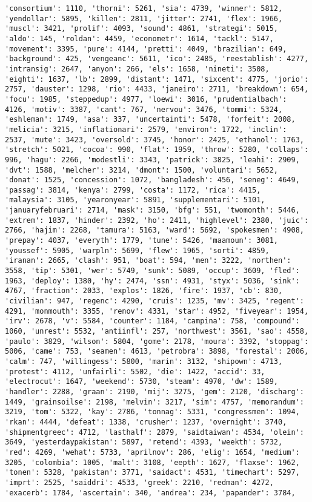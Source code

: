 \documentclass[11pt]{article}
\begin{document}
\begin{Verbatim}[commandchars=\\\{\}]
'consortium': 1110, 'thorni': 5261, 'sia': 4739, 'winner': 5812, 'yendollar': 5895, 'killen': 2811, 'jitter': 2741, 'flex': 1966, 'muscl': 3421, 'prolif': 4093, 'sound': 4861, 'strategi': 5015, 'aldo': 145, 'roldan': 4459, 'econometr': 1614, 'tackl': 5147, 'movement': 3395, 'pure': 4144, 'pretti': 4049, 'brazilian': 649, 'background': 425, 'vengeanc': 5611, 'ico': 2485, 'reestablish': 4277, 'intransig': 2647, 'anyon': 266, 'els': 1658, 'nineti': 3508, 'eighti': 1637, 'lb': 2899, 'distant': 1471, 'sixcent': 4775, 'jorio': 2757, 'dauster': 1298, 'rio': 4433, 'janeiro': 2711, 'breakdown': 654, 'focu': 1985, 'steppedup': 4977, 'loewi': 3016, 'prudentialbach': 4126, 'motiv': 3387, 'cant': 767, 'nervou': 3476, 'tommi': 5324, 'eshleman': 1749, 'asa': 337, 'uncertainti': 5478, 'forfeit': 2008, 'melicia': 3215, 'inflationari': 2579, 'environ': 1722, 'inclin': 2537, 'mute': 3423, 'oversold': 3745, 'honor': 2425, 'ethanol': 1763, 'stretch': 5021, 'cocoa': 990, 'flat': 1959, 'throw': 5280, 'collaps': 996, 'hagu': 2266, 'modestli': 3343, 'patrick': 3825, 'leahi': 2909, 'dvt': 1588, 'melcher': 3214, 'dmont': 1500, 'voluntari': 5652, 'donat': 1525, 'concession': 1072, 'bangladesh': 456, 'seneg': 4649, 'passag': 3814, 'kenya': 2799, 'costa': 1172, 'rica': 4415, 'malaysia': 3105, 'yearonyear': 5891, 'supplementari': 5101, 'januaryfebruari': 2714, 'mask': 3150, 'bfg': 551, 'twomonth': 5446, 'extrem': 1837, 'hinder': 2392, 'ho': 2411, 'highlevel': 2380, 'juic': 2766, 'hajim': 2268, 'tamura': 5163, 'ward': 5692, 'spokesmen': 4908, 'prepay': 4037, 'everyth': 1779, 'tune': 5426, 'maamoun': 3081, 'youssef': 5905, 'warpln': 5699, 'flew': 1965, 'sorti': 4859, 'iranan': 2665, 'clash': 951, 'boat': 594, 'men': 3222, 'northen': 3558, 'tip': 5301, 'wer': 5749, 'sunk': 5089, 'occup': 3609, 'fled': 1963, 'deploy': 1380, 'hy': 2474, 'ssn': 4931, 'styx': 5036, 'sink': 4767, 'fraction': 2033, 'explos': 1826, 'fire': 1937, 'cb': 830, 'civilian': 947, 'regenc': 4290, 'cruis': 1235, 'mv': 3425, 'regent': 4291, 'monmouth': 3355, 'renov': 4331, 'star': 4952, 'fiveyear': 1954, 'irv': 2678, 'v': 5584, 'counter': 1184, 'campina': 758, 'compound': 1060, 'unrest': 5532, 'antiinfl': 257, 'northwest': 3561, 'sao': 4558, 'paulo': 3829, 'wilson': 5804, 'gome': 2178, 'moura': 3392, 'stoppag': 5006, 'came': 753, 'seamen': 4613, 'petrobra': 3898, 'forestal': 2006, 'calm': 747, 'willingess': 5800, 'marin': 3132, 'shipown': 4713, 'protest': 4112, 'unfairli': 5502, 'die': 1422, 'accid': 33, 'electrocut': 1647, 'weekend': 5730, 'steam': 4970, 'dw': 1589, 'handler': 2288, 'graan': 2190, 'mij': 3275, 'gem': 2120, 'discharg': 1449, 'grainsoilse': 2198, 'melvin': 3217, 'sim': 4757, 'memorandum': 3219, 'tom': 5322, 'kay': 2786, 'tonnag': 5331, 'congressmen': 1094, 'rkan': 4444, 'defeat': 1338, 'crusher': 1237, 'overnight': 3740, 'shipmentgreec': 4712, 'lasthalf': 2879, 'saidtaiwan': 4534, 'olein': 3649, 'yesterdaypakistan': 5897, 'retend': 4393, 'weekth': 5732, 'red': 4269, 'wehat': 5733, 'aprilnov': 286, 'elig': 1654, 'medium': 3205, 'colombia': 1005, 'malt': 3108, 'eepth': 1627, 'flaxse': 1962, 'tonen': 5328, 'pakistan': 3771, 'saidact': 4531, 'timechart': 5297, 'imprt': 2525, 'saiddri': 4533, 'greek': 2210, 'redman': 4272, 'exacerb': 1784, 'ascertain': 340, 'andrea': 234, 'papander': 3784, 
\end{Verbatim}
\end{document}
